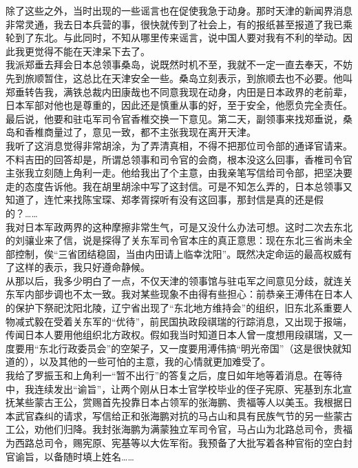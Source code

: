 除了这些之外，当时出现的一些谣言也在促使我急于动身。那时天津的新闻界消息非常灵通，我去日本兵营的事，很快就传到了社会上，有的报纸甚至报道了我已乘轮到了东北。与此同时，不知从哪里传来谣言，说中国人要对我有不利的举动。因此我更觉得不能在天津呆下去了。\\

我派郑垂去拜会日本总领事桑岛，说既然时机不至，我就不一定一直去奉天，不妨先到旅顺暂住，这总比在天津安全一些。桑岛立刻表示，到旅顺去也不必要。他叫郑垂转告我，满铁总裁内田康哉也不同意我现在动身，内田是日本政界的老前辈，日本军部对他也是尊重的，因此还是慎重从事的好，至于安全，他愿负完全责任。最后说，他要和驻屯军司令官香椎交换一下意见。第二天，副领事来找郑垂说，桑岛和香椎商量过了，意见一致，都不主张我现在离开天津。\\

我听了这消息觉得非常胡涂，为了弄清真相，不得不把那位司令部的通译官请来。不料吉田的回答却是，所谓总领事和司令官的会商，根本没这么回事，香椎司令官主张我立刻随上角利一走。他给我出了个主意，由我亲笔写信给司令部，把坚决要走的态度告诉他。我在胡里胡涂中写了这封信。可是不知怎么弄的，日本总领事又知道了，连忙来找陈宝琛、郑孝胥探听有没有这回事，那封信是真的还是假的？……\\

我对日本军政两界的这种摩擦非常生气，可是又没什么办法可想。这时二次去东北的刘骧业来了信，说是探得了关东军司令官本庄的真正意思：现在东北三省尚未全部控制，俟“三省团结稳固，当由内田请上临幸沈阳”。既然决定命运的最高权威有了这样的表示，我只好遵命静候。\\

从那以后，我多少明白了一点，不仅天津的领事馆与驻屯军之间意见分歧，就连关东军内部步调也不太一致。我对某些现象不由得有些担心：前恭亲王溥伟在日本人的保护下祭祀沈阳北陵，辽宁省出现了“东北地方维持会”的组织，旧东北系重要人物减式毅在受着关东军的“优待”，前民国执政段祺瑞的行踪消息，又出现于报端，传闻日本人要用他组织北方政权。假如我当时知道日本人曾一度想用段祺瑞，又一度要用“东北行政委员会”的空架子，又一度要用溥伟搞“明光帝国”（这是很快就知道的），以及其他的一些可怕的主意，我的心情就更加难受了。\\

我给了罗振玉和上角利一“暂不出行”的答复之后，度日如年地等着消息。在等待中，我连续发出“谕旨”，让两个刚从日本士官学校毕业的侄子宪原、宪基到东北宣抚某些蒙古王公，赏赐首先投靠日本占领军的张海鹏、贵福等人以美玉。我根据日本武官森纠的请求，写信给正和张海鹏对抗的马占山和具有民族气节的另一些蒙古工公，劝他们归降。我封张海鹏为满蒙独立军司令官，马占山为北路总司令，贵福为西路总司令，赐宪原、宪基等以大佐军衔。我预备了大批写着各种官衔的空白封官谕旨，以备随时填上姓名……\\

